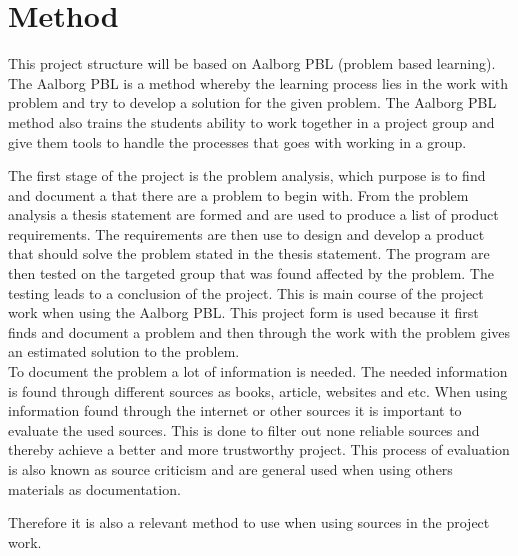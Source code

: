 \section{Method}
This project structure will be based on Aalborg PBL (problem based learning). The Aalborg PBL is a method whereby the learning process lies in the work with problem and try to develop a solution for the given problem.
The Aalborg PBL method also trains the students ability to work together in a project group and give them tools to handle the processes that goes with working in a group.

The first stage of the project is the problem analysis, which purpose is to find and document a that there are a problem to begin with. From the problem analysis a thesis statement are formed and are used to produce a list of product requirements.
The requirements are then use to design and develop a product that should solve the problem stated in the thesis statement.
The program are then tested on the targeted group that was found affected by the problem. The testing leads to a conclusion of the project. This is main course of the project work when using the Aalborg PBL.
This project form is used because it first finds and document a problem and then through the work with the problem gives an estimated solution to the problem.\\

To document the problem a lot of information is needed. The needed information is found through different sources as books, article, websites and etc. When using information found through the internet or other sources it is important to evaluate the used sources.
This is done to filter out none reliable sources and thereby achieve a better and more trustworthy project.
This process of evaluation is also known as source criticism and are general used when using others materials as documentation.

Therefore it is also a relevant method to use when using sources in the project work.\\
